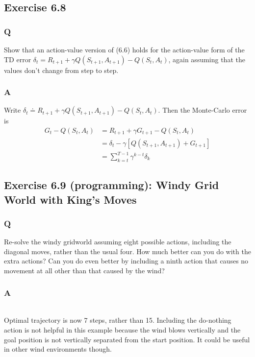 \subsection{Exercise 6.8}
\subsubsection{Q}
Show that an action-value version of (6.6) holds for the action-value form of the TD error $\delta_t = R_{t+1} + \gamma Q(S_{t+1}, A_{t+1}) - Q(S_t, A_t)$, again assuming that the values don’t change from step to step.
\subsubsection{A}
Write $\delta_t \doteq R_{t+1} + \gamma Q(S_{t+1}, A_{t+1}) -  Q(S_t, A_t)$. Then the Monte-Carlo error is
\begin{align*}
    G_t - Q(S_t, A_t) &= R_{t+1} + \gamma G_{t+1} - Q(S_t, A_t) \\
                      &= \delta_t - \gamma [Q(S_{t+1}, A_{t+1}) + G_{t+1}]\\
                      &= \sum_{k=t}^{T-1}\gamma^{k-t}\delta_k
\end{align*}

\subsection{Exercise 6.9 (programming): Windy Grid World with King's Moves}
\subsubsection{Q}
Re-solve the windy gridworld assuming eight possible actions, including the diagonal moves, rather than the usual four. How much better can you do with the extra actions? Can you do even better by including a ninth action that causes no movement at all other than that caused by the wind?

\subsubsection{A}
\ProgrammingExercise\\

Optimal trajectory is now 7 steps, rather than 15. Including the do-nothing action is not helpful in this example because the wind blows vertically and the goal position is not vertically separated from the start position. It could be useful in other wind environments though.\\

